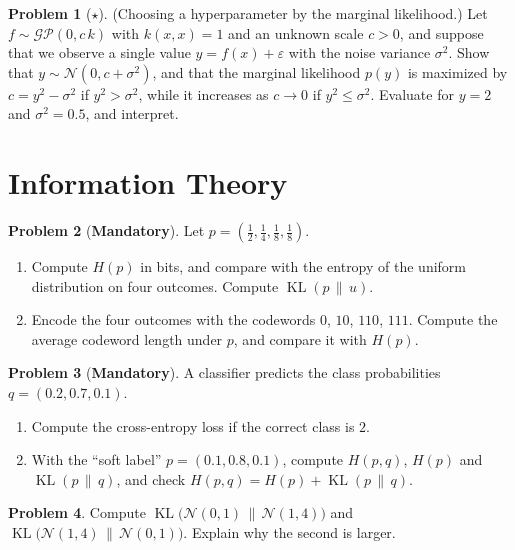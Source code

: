\documentclass[11pt]{article}
\theoremstyle{definition}
\newtheorem{problem}{Problem}[section]
\newcommand{\mandatory}{\textcolor{red!70!black}{\textbf{Mandatory}}}
\DeclareMathOperator{\KL}{KL}
\begin{document}
\begin{problem}[$\star$]\label{pr:gp-evidence}
    (Choosing a hyperparameter by the marginal likelihood.) Let $f \sim \mathcal{GP}(0, c\,k)$ with $k(x, x) = 1$ and an unknown scale $c > 0$, and suppose that we observe a single value $y = f(x) + \varepsilon$ with the noise variance $\sigma^2$. Show that $y \sim \mathcal{N}(0, c + \sigma^2)$, and that the marginal likelihood $p(y)$ is maximized by $c = y^2 - \sigma^2$ if $y^2 > \sigma^2$, while it increases as $c \to 0$ if $y^2 \leq \sigma^2$. Evaluate for $y = 2$ and $\sigma^2 = 0.5$, and interpret.
\end{problem}

\section{Information Theory}

\begin{problem}[\mandatory]\label{pr:entropy-code}
    Let $p = (\frac{1}{2}, \frac{1}{4}, \frac{1}{8}, \frac{1}{8})$.
    \begin{enumerate}[label=(\alph*)]
        \item Compute $H(p)$ in bits, and compare with the entropy of the uniform distribution on four outcomes. Compute $\KL(p \,\|\, u)$.
        \item Encode the four outcomes with the codewords $0$, $10$, $110$, $111$. Compute the average codeword length under $p$, and compare it with $H(p)$.
    \end{enumerate}
\end{problem}

\begin{problem}[\mandatory]\label{pr:cross-entropy}
    A classifier predicts the class probabilities $q = (0.2, 0.7, 0.1)$.
    \begin{enumerate}[label=(\alph*)]
        \item Compute the cross-entropy loss if the correct class is $2$.
        \item With the ``soft label'' $p = (0.1, 0.8, 0.1)$, compute $H(p, q)$, $H(p)$ and $\KL(p \,\|\, q)$, and check $H(p, q) = H(p) + \KL(p \,\|\, q)$.
    \end{enumerate}
\end{problem}

\begin{problem}\label{pr:kl-gauss-practice}
    Compute $\KL\big(\mathcal{N}(0, 1) \,\|\, \mathcal{N}(1, 4)\big)$ and $\KL\big(\mathcal{N}(1, 4) \,\|\, \mathcal{N}(0, 1)\big)$. Explain why the second is larger.
\end{problem}
\end{document}
